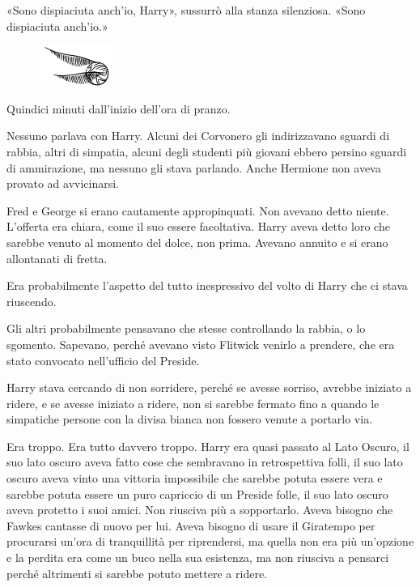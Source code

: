 «Sono dispiaciuta anch’io, Harry», sussurrò alla stanza silenziosa. «Sono dispiaciuta anch’io.»

\begin{figure}[h!]
        \includegraphics[scale=0.4]{boccino.png}
        \centering
\end{figure}

Quindici minuti dall’inizio dell’ora di pranzo.

Nessuno parlava con Harry. Alcuni dei Corvonero gli indirizzavano sguardi di rabbia, altri di simpatia, alcuni degli studenti più giovani ebbero persino sguardi di ammirazione, ma nessuno gli stava parlando. Anche Hermione non aveva provato ad avvicinarsi.

Fred e George si erano cautamente appropinquati. Non avevano detto niente. L’offerta era chiara, come il suo essere facoltativa. Harry aveva detto loro che sarebbe venuto al momento del dolce, non prima. Avevano annuito e si erano allontanati di fretta.

Era probabilmente l’aspetto del tutto inespressivo del volto di Harry che ci stava riuscendo.

Gli altri probabilmente pensavano che stesse controllando la rabbia, o lo sgomento. Sapevano, perché avevano visto Flitwick venirlo a prendere, che era stato convocato nell’ufficio del Preside.

Harry stava cercando di non sorridere, perché se avesse sorriso, avrebbe iniziato a ridere, e se avesse iniziato a ridere, non si sarebbe fermato fino a quando le simpatiche persone con la divisa bianca non fossero venute a portarlo via.

Era troppo. Era tutto davvero troppo. Harry era quasi passato al Lato Oscuro, il suo lato oscuro aveva fatto cose che sembravano in retrospettiva folli, il suo lato oscuro aveva vinto una vittoria impossibile che sarebbe potuta essere vera e sarebbe potuta essere un puro capriccio di un Preside folle, il suo lato oscuro aveva protetto i suoi amici. Non riusciva più a sopportarlo. Aveva bisogno che Fawkes cantasse di nuovo per lui. Aveva bisogno di usare il Giratempo per procurarsi un’ora di tranquillità per riprendersi, ma quella non era più un’opzione e la perdita era come un buco nella sua esistenza, ma non riusciva a pensarci perché altrimenti si sarebbe potuto mettere a ridere.

